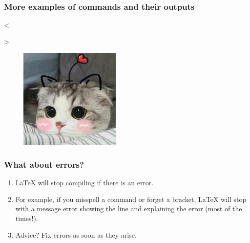 \begin{frame}[fragile]
\frametitle{More examples of commands and their outputs}
\begin{framed}
\begin{minipage}[b]{.4\textwidth}
  \begin{verbnobox}[\vbdelim]
<>
\end{verbnobox}
\end{minipage}%
\end{framed}
\begin{framed}
\begin{minipage}[b]{.1\textwidth}
\begin{figure}
\includegraphics[width=50mm]{figures/cat.jpeg}
\end{figure}
\end{minipage}
\end{framed}
\end{frame}


\begin{frame}[fragile] %
\frametitle{What about errors? }
\begin{enumerate}
\item \LaTeX{} will stop compiling if there is an error. 
\item For example, if you misspell a command or forget a bracket, \LaTeX{} will stop with a message error showing the line and explaining the error (most of the times!).
\item Advice? Fix errors as soon as they arise.
\end{enumerate}
\end{frame}

